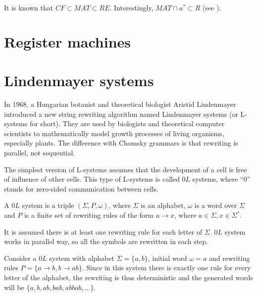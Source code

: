 It is known that $CF \subset MAT \subset RE$. Interestingly, $MAT \cap {a}^* \subset R$ (see \cite{Besozzi:PhD:2004}).


\section{Register machines} %
\label{sec:register_machines}





\section{Lindenmayer systems} %
\label{sec:lindenmayer_systems}

In 1968, a Hungarian botanist and theoretical biologist Aristid Lindenmayer introduced \cite{Lindenmayer68} a new string rewriting algorithm named Lindenmayer systems (or L-systems for short). They are used by biologists and theoretical computer scientists to mathematically model growth processes of living organisms, especially plants. The difference with Chomsky grammars is that rewriting is parallel, not sequential.

The simplest version of L-systems assumes that the development of a cell is free of influence of other cells.
This type of L-systems is called $0L$ systems, where ``0'' stands for zero-sided communication between cells.

\begin{definition}
A $0L$ system is a triple $(\Sigma, P, \omega)$, where $\Sigma$ is an alphabet, $\omega$ is a word over $\Sigma$ and $P$ is a finite set of rewriting rules of the form $a\rightarrow x$, where $a\in\Sigma, x\in\Sigma^*$.
\end{definition}

It is assumed there is at least one rewriting rule for each letter of $\Sigma$. $0L$ system works in parallel way, so all the symbols are rewritten in each step.

\begin{example}
Consider a $0L$ system with alphabet $\Sigma = \{a,b\}$, initial word $\omega = a$ and rewriting rules $P = \{a\rightarrow b, b\rightarrow ab\}$.
Since in this system there is exactly one rule for every letter of the alphabet, the rewriting is thus deterministic and the generated words will be $\{a, b, ab, bab, abbab, \ldots \}$. 
\end{example}

